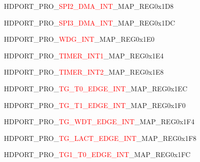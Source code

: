 \begin{register}{H}{DPORT\_PRO\_\textcolor{red}{SPI2\_DMA\_INT}\_MAP\_REG}{0x1D8}\label{regdesc:PROSPI2DMAINTMAPREG}
\end{register}
\vspace{-3em}
\begin{register}{H}{DPORT\_PRO\_\textcolor{red}{SPI3\_DMA\_INT}\_MAP\_REG}{0x1DC}\label{regdesc:PROSPI3DMAINTMAPREG}
\end{register}
\vspace{-3em}
\begin{register}{H}{DPORT\_PRO\_\textcolor{red}{WDG\_INT}\_MAP\_REG}{0x1E0}\label{regdesc:PROWDGINTMAPREG}
\end{register}
\vspace{-3em}
\begin{register}{H}{DPORT\_PRO\_\textcolor{red}{TIMER\_INT1}\_MAP\_REG}{0x1E4}\label{regdesc:PROTIMERINT1MAPREG}
\end{register}
\vspace{-3em}
\begin{register}{H}{DPORT\_PRO\_\textcolor{red}{TIMER\_INT2}\_MAP\_REG}{0x1E8}\label{regdesc:PROTIMERINT2MAPREG}
\end{register}
\vspace{-3em}
\begin{register}{H}{DPORT\_PRO\_\textcolor{red}{TG\_T0\_EDGE\_INT}\_MAP\_REG}{0x1EC}\label{regdesc:PROTGT0EDGEINTMAPREG}
\end{register}
\vspace{-3em}
\begin{register}{H}{DPORT\_PRO\_\textcolor{red}{TG\_T1\_EDGE\_INT}\_MAP\_REG}{0x1F0}\label{regdesc:PROTGT1EDGEINTMAPREG}
\end{register}
\vspace{-3em}
\begin{register}{H}{DPORT\_PRO\_\textcolor{red}{TG\_WDT\_EDGE\_INT}\_MAP\_REG}{0x1F4}\label{regdesc:PROTGWDTEDGEINTMAPREG}
\end{register}
\vspace{-3em}
\begin{register}{H}{DPORT\_PRO\_\textcolor{red}{TG\_LACT\_EDGE\_INT}\_MAP\_REG}{0x1F8}\label{regdesc:PROTGLACTEDGEINTMAPREG}
\end{register}
\vspace{-3em}
\begin{register}{H}{DPORT\_PRO\_\textcolor{red}{TG1\_T0\_EDGE\_INT}\_MAP\_REG}{0x1FC}\label{regdesc:PROTG1T0EDGEINTMAPREG}
\end{register}
